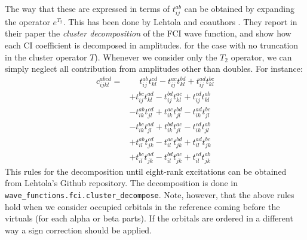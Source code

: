 The way that these are expressed in terms of $t_{ij}^{ab}$ can be obtained by expanding the operator $e^{T_2}$.
This has been done by Lehtola and coauthors \cite{}.
They report in their paper the \emph{cluster decomposition} of the FCI wave function,
and show how each CI coefficient is decomposed in amplitudes.
for the case with no truncation in the cluster operator $T$).
Whenever we consider only the $T_2$ operator,
we can simply neglect all contribution from amplitudes other than doubles.
For instance:
\begin{equation}
  \begin{split}
    c_{ijkl}^{abcd} =
    & \phantom{+} t_{ij}^{ab}t_{kl}^{cd} - t_{ij}^{ac}t_{kl}^{bd} + t_{ij}^{ad}t_{kl}^{bc}\\
  & + t_{ij}^{bc}t_{kl}^{ad} - t_{ij}^{bd}t_{kl}^{ac} + t_{ij}^{cd}t_{kl}^{ab}\\
  & - t_{ik}^{ab}t_{jl}^{cd} + t_{ik}^{ac}t_{jl}^{bd} - t_{ik}^{ad}t_{jl}^{bc}\\
  & - t_{ik}^{bc}t_{jl}^{ad} + t_{ik}^{bd}t_{jl}^{ac} - t_{ik}^{cd}t_{jl}^{ab}\\
  & + t_{il}^{ab}t_{jk}^{cd} - t_{il}^{ac}t_{jk}^{bd} + t_{il}^{ad}t_{jk}^{bc}\\
  & + t_{il}^{bc}t_{jk}^{ad} - t_{il}^{bd}t_{jk}^{ac} + t_{il}^{cd}t_{jk}^{ab}
  \end{split}
\end{equation}
This rules for the decomposition until eight-rank excitations can be obtained
from Lehtola's Github repository.
The decomposition is done in \texttt{wave\_functions.fci.cluster\_decompose}.
Note, however, that the above rules hold when we consider occupied orbitals
in the reference coming before the virtuals (for each alpha or beta parts).
If the orbitals are ordered in a different way a sign correction should be applied.

